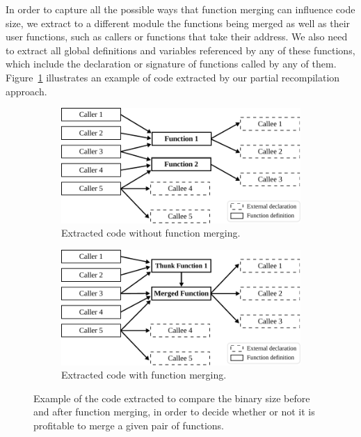 In order to capture all the possible ways that function merging can influence code size, we extract to a different module the functions being merged as well as their user functions, such as callers or functions that take their address.
We also need to extract all global definitions and variables referenced by any of these functions, which include the declaration or signature of functions called by any of them.
Figure~\ref{fig:our-cost-model-callgraph-1} illustrates an example of code extracted by our partial recompilation approach.

\begin{figure}[h]
\centering
\begin{subfigure}{\textwidth}
\centering
  \includegraphics[scale=0.8]{src/deeplearning/figs/our-cost-model-callgraph-1.pdf}
  \caption{Extracted code without function merging.}
  \label{fig:our-cost-model-callgraph-1}
\end{subfigure}
\begin{subfigure}{\textwidth}
\centering
  \includegraphics[scale=0.8]{src/deeplearning/figs/our-cost-model-callgraph-2.pdf}
  \caption{Extracted code with function merging.}
  \label{fig:our-cost-model-callgraph-2}
\end{subfigure}
\caption{Example of the code extracted to compare the binary size before and after function merging, in order to decide whether or not it is profitable to merge a given pair of functions.}
\label{fig:our-cost-model-callgraphs}
\end{figure}

